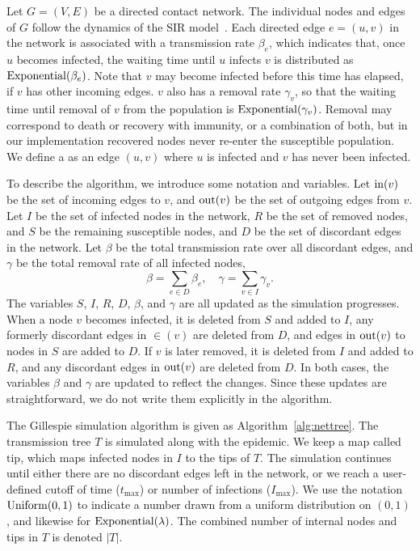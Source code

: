 Let $G = (V, E)$ be a directed contact network. The individual nodes and edges
of $G$ follow the dynamics of the \gls{SIR}
model~\autocite{kermack1927contribution}. Each directed edge $e = (u, v)$ in
the network is associated with a transmission rate $\beta_e$, which indicates
that, once $u$ becomes infected, the waiting time until $u$ infects $v$ is
distributed as $\operatorname{Exponential}(\beta_e)$. Note that $v$ may become infected
before this time has elapsed, if $v$ has other incoming edges. $v$ also has a
removal rate $\gamma_v$, so that the waiting time until removal of $v$ from the
population is $\operatorname{Exponential}(\gamma_v)$. Removal may correspond to death or
recovery with immunity, or a combination of both, but in our implementation
recovered nodes never re-enter the susceptible population. We define a
 as an edge $(u, v)$ where $u$ is infected and $v$
has never been infected.

To describe the algorithm, we introduce some notation and variables. Let
$\operatorname{in}(v)$ be the set of incoming edges to $v$, and $\operatorname{out}(v)$ be the set of
outgoing edges from $v$. Let $I$ be the set of infected nodes in the network,
$R$ be the set of removed nodes, and $S$ be the remaining susceptible nodes,
and $D$ be the set of discordant edges in the network. Let $\beta$ be the total
transmission rate over all discordant edges, and $\gamma$ be the total removal
rate of all infected nodes,
\[
  \beta = \sum_{e \in D} \beta_e, \quad
  \gamma = \sum_{v \in I} \gamma_v.
\]
The variables $S$, $I$, $R$, $D$, $\beta$, and $\gamma$ are all updated as the
simulation progresses. When a node $v$ becomes infected, it is deleted from $S$
and added to $I$, any formerly discordant edges in $\in(v)$ are deleted from
$D$, and edges in $\operatorname{out}(v)$ to nodes in $S$ are added to $D$. If $v$ is later
removed, it is deleted from $I$ and added to $R$, and any discordant edges in
$\operatorname{out}(v)$ are deleted from $D$. In both cases, the variables $\beta$ and
$\gamma$ are updated to reflect the changes. Since these updates are
straightforward, we do not write them explicitly in the algorithm.

\newcommand{\tip}{\mathrm{tip}}

The Gillespie simulation algorithm is given as Algorithm~\ref{alg:nettree}. The
transmission tree $T$ is simulated along with the epidemic. We keep a map
called $\tip$, which maps infected nodes in $I$ to the tips of $T$. The
simulation continues until either there are no discordant edges left in the
network, or we reach a user-defined cutoff of time ($t_{\max}$) or number of
infections ($I_{\max}$). We use the notation $\operatorname{Uniform}(0, 1)$ to indicate a
number drawn from a uniform distribution on $(0, 1)$, and likewise for
$\operatorname{Exponential}(\lambda)$. The combined number of internal nodes and tips in $T$
is denoted $|T|$.

